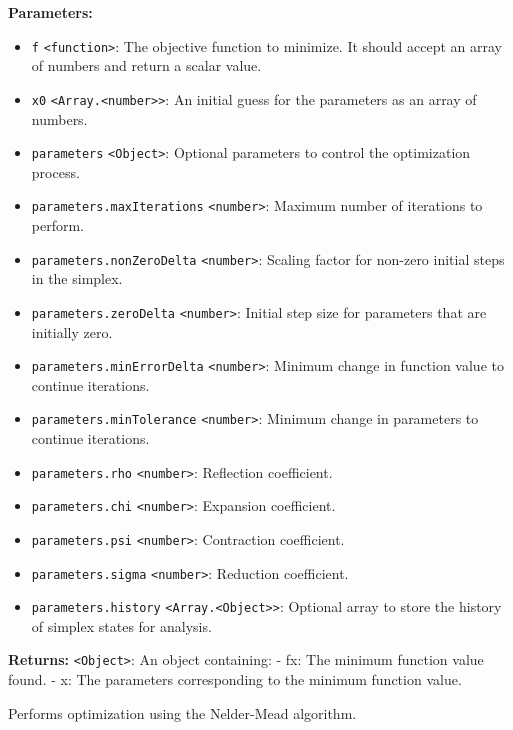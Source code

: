 \documentclass[12pt,a4paper]{article}
\begin{document}
\noindent \textbf{Parameters:}
\begin{itemize}
  \item \texttt{f} \texttt{<function>}: The objective function to minimize. It should accept an array of numbers and return a scalar value.
  \item \texttt{x0} \texttt{<Array.<number>>}: An initial guess for the parameters as an array of numbers.
  \item \texttt{parameters} \texttt{<Object>}: Optional parameters to control the optimization process.
  \item \texttt{parameters.maxIterations} \texttt{<number>}: Maximum number of iterations to perform.
  \item \texttt{parameters.nonZeroDelta} \texttt{<number>}: Scaling factor for non-zero initial steps in the simplex.
  \item \texttt{parameters.zeroDelta} \texttt{<number>}: Initial step size for parameters that are initially zero.
  \item \texttt{parameters.minErrorDelta} \texttt{<number>}: Minimum change in function value to continue iterations.
  \item \texttt{parameters.minTolerance} \texttt{<number>}: Minimum change in parameters to continue iterations.
  \item \texttt{parameters.rho} \texttt{<number>}: Reflection coefficient.
  \item \texttt{parameters.chi} \texttt{<number>}: Expansion coefficient.
  \item \texttt{parameters.psi} \texttt{<number>}: Contraction coefficient.
  \item \texttt{parameters.sigma} \texttt{<number>}: Reduction coefficient.
  \item \texttt{parameters.history} \texttt{<Array.<Object>>}: Optional array to store the history of simplex states for analysis.
\end{itemize}

\noindent \textbf{Returns:} \texttt{<Object>}: An object containing:
  - \textasciigrave{}fx\textasciigrave{}: The minimum function value found.
  - \textasciigrave{}x\textasciigrave{}: The parameters corresponding to the minimum function value.

\noindent Performs optimization using the Nelder-Mead algorithm.

\vspace{5mm}
\noindent {}
\end{document}

